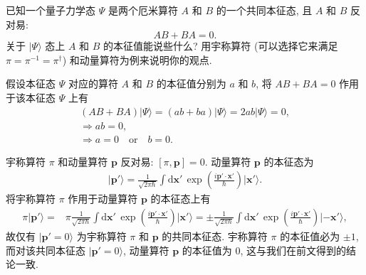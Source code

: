 \documentclass{assignment}
\begin{document}
\begin{prob}[课本习题 4.3]
    已知一个量子力学态 $\Psi$ 是两个厄米算符 $A$ 和 $B$ 的一个共同本征态, 且 $A$ 和 $B$ 反对易:
    \[
        AB+BA=0.
    \]
    关于 $\lvert\Psi\rangle$ 态上 $A$ 和 $B$ 的本征值能说些什么? 用宇称算符 (可以选择它来满足 $\pi=\pi^{-1}=\pi^{\dagger}$) 和动量算符为例来说明你的观点.
\end{prob}
\begin{sol}
    假设本征态 $\Psi$ 对应的算符 $A$ 和 $B$ 的本征值分别为 $a$ 和 $b$, 将 $AB+BA=0$ 作用于该本征态 $\Psi$ 上有
    \begin{gather}
        (AB+BA)\lvert\Psi\rangle=(ab+ba)\lvert\Psi\rangle=2ab\lvert\Psi\rangle=0,\\
        \Longrightarrow ab=0,\\
        \Longrightarrow a=0\quad\text{or}\quad b=0.
    \end{gather}

    宇称算符 $\pi$ 和动量算符 $\bm{p}$ 反对易: $[\pi,\bm{p}]=0$. 动量算符 $\bm{p}$ 的本征态为
    \begin{align}
        \lvert\bm{p}'\rangle=\frac{1}{\sqrt{2\pi\hbar}}\int\mathrm{d}\bm{x}'\,\exp\left(\frac{i\bm{p}'\cdot\bm{x}'}{\hbar}\right)\lvert\bm{x}'\rangle.
    \end{align}
    将宇称算符 $\pi$ 作用于动量算符 $\bm{p}$ 的本征态上有
    \begin{align}
        \pi\lvert\bm{p}'\rangle=&\pi\frac{1}{\sqrt{2\pi\hbar}}\int\mathrm{d}\bm{x}'\,\exp\left(\frac{i\bm{p}'\cdot\bm{x}'}{\hbar}\right)\lvert\bm{x}'\rangle=\pm\frac{1}{\sqrt{2\pi\hbar}}\int\mathrm{d}\bm{x}'\,\exp\left(\frac{i\bm{p}'\cdot\bm{x}'}{\hbar}\right)\lvert-\bm{x}'\rangle,
    \end{align}
    故仅有 $\lvert\bm{p}'=0\rangle$ 为宇称算符 $\pi$ 和 $\bm{p}$ 的共同本征态.
    宇称算符 $\pi$ 的本征值必为 $\pm 1$, 而对该共同本征态 $\lvert\bm{p}'=0\rangle$, 动量算符 $\bm{p}$ 的本征值为 $0$, 这与我们在前文得到的结论一致.
\end{sol}
\end{document}

